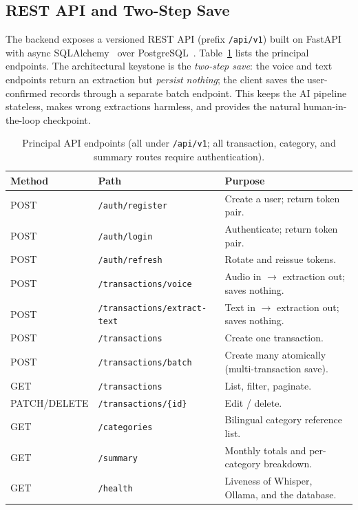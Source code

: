 \subsection{REST API and Two-Step Save}

The backend exposes a versioned REST API (prefix \texttt{/api/v1}) built on
FastAPI~\cite{fastapi} with async SQLAlchemy~\cite{sqlalchemy} over
PostgreSQL~\cite{postgresql}. Table~\ref{tab:endpoints} lists the principal
endpoints. The architectural keystone is the \emph{two-step save}: the voice and
text endpoints return an extraction but \emph{persist nothing}; the client saves
the user-confirmed records through a separate batch endpoint. This keeps the AI
pipeline stateless, makes wrong extractions harmless, and provides the natural
human-in-the-loop checkpoint.

\begin{table}[H]
\centering
\caption{Principal API endpoints (all under \texttt{/api/v1}; all transaction, category, and summary routes require authentication).}
\label{tab:endpoints}
\small
\renewcommand{\arraystretch}{1.2}
\begin{tabularx}{\textwidth}{l l X}
\toprule
\textbf{Method} & \textbf{Path} & \textbf{Purpose} \\
\midrule
POST & \texttt{/auth/register} & Create a user; return token pair. \\
POST & \texttt{/auth/login} & Authenticate; return token pair. \\
POST & \texttt{/auth/refresh} & Rotate and reissue tokens. \\
POST & \texttt{/transactions/voice} & Audio in $\rightarrow$ extraction out; saves nothing. \\
POST & \texttt{/transactions/extract-text} & Text in $\rightarrow$ extraction out; saves nothing. \\
POST & \texttt{/transactions} & Create one transaction. \\
POST & \texttt{/transactions/batch} & Create many atomically (multi-transaction save). \\
GET & \texttt{/transactions} & List, filter, paginate. \\
PATCH/DELETE & \texttt{/transactions/\{id\}} & Edit / delete. \\
GET & \texttt{/categories} & Bilingual category reference list. \\
GET & \texttt{/summary} & Monthly totals and per-category breakdown. \\
GET & \texttt{/health} & Liveness of Whisper, Ollama, and the database. \\
\bottomrule
\end{tabularx}
\end{table}

